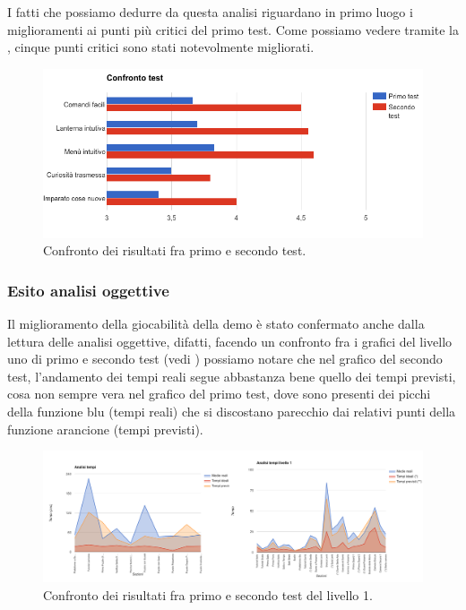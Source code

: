 I fatti che possiamo dedurre da questa analisi riguardano in primo luogo i miglioramenti ai punti più critici del primo test. Come possiamo vedere tramite la \myfig{\ref{fig:test-confronto}}, cinque punti critici sono stati notevolmente migliorati.

\begin{figure}[h]
\centerline{\includegraphics[scale=0.55]{images/risultati/test-confronto.png}}
\caption{Confronto dei risultati fra primo e secondo test.}
\label{fig:test-confronto}
\end{figure}

\subsubsection{Esito analisi oggettive}

Il miglioramento della giocabilità della demo è stato confermato anche dalla lettura delle analisi oggettive, difatti, facendo un confronto fra i grafici del livello uno di primo e secondo test (vedi \myfig{\ref{fig:test-confronto-tempi1}}) possiamo notare che nel grafico del secondo test, l'andamento dei tempi reali segue abbastanza bene quello dei tempi previsti, cosa non sempre vera nel grafico del primo test, dove sono presenti dei picchi della funzione blu (tempi reali) che si discostano parecchio dai relativi punti della funzione arancione (tempi previsti).

\begin{figure}[h]
\centerline{\includegraphics[scale=0.3]{images/risultati/test-confronto-tempi1.png}}
\caption{Confronto dei risultati fra primo e secondo test del livello 1.}
\label{fig:test-confronto-tempi1}
\end{figure}

